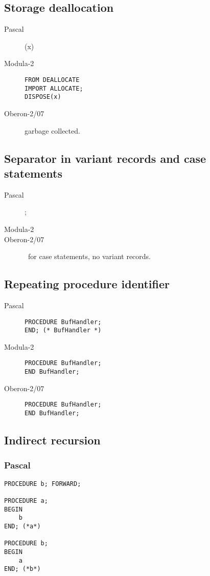 \documentclass[10pt]{article}
\begin{document}
\subsection{Storage deallocation}
\begin{description}
    \item[Pascal] \NEW(x) 
    \item[Modula-2] \lstinline!FROM DEALLOCATE! \\
    \lstinline!IMPORT ALLOCATE;! \\
    \lstinline!DISPOSE(x)!
    \item[Oberon-2/07] garbage collected.
\end{description}

\subsection{Separator in variant records and case statements}
\begin{description}
    \item[Pascal] ; 
    \item[Modula-2] \textbar
    \item[Oberon-2/07] \textbar\ for case statements, no variant records.
\end{description}

\subsection{Repeating procedure identifier}
\begin{description}
    \item[Pascal] \lstinline!PROCEDURE BufHandler;! \\
    \lstinline!END; (* BufHandler *)!
    \item[Modula-2] \lstinline!PROCEDURE BufHandler;! \\
    \lstinline!END BufHandler;!
    \item[Oberon-2/07] \lstinline!PROCEDURE BufHandler;! \\
    \lstinline!END BufHandler;!
\end{description}

\subsection{Indirect recursion}

\subsubsection{Pascal}
\begin{lstlisting}[style=example]   
PROCEDURE b; FORWARD;
    
PROCEDURE a; 
BEGIN
    b
END; (*a*)
    
PROCEDURE b; 
BEGIN
    a
END; (*b*)    
\end{lstlisting} 
\end{document}
